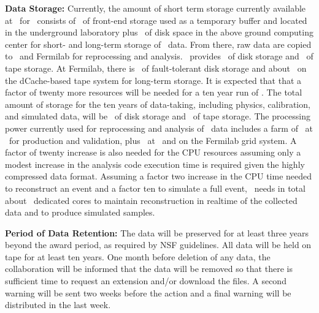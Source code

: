 {\bf Data Storage:} Currently, the amount of short term storage currently available at \LNGS\ for \DSf\ consists of \DSfDataStorageLNGSShortDisk\ of front-end storage used as a temporary buffer and located in the underground laboratory plus \DSfDataStorageLNGSLongDisk\ of disk space in the above ground computing center for short- and long-term storage of \DSf\ data.  From there, raw data are copied to \CNAF\ and Fermilab for reprocessing and analysis.  \CNAF\ provides  \DSfDataStorageCNAFDisk\ of disk storage and \DSfDataStorageCNAFTape\ of tape storage.  At Fermilab, there is \DSfDataStorageFNALDisk\ of fault-tolerant disk storage and about \DSfDataStorageFNALTape\ on the dCache-based tape system for long-term storage.  It is expected that that a factor of twenty more resources will be needed for a ten year run of \DSks.  The total amount of storage for the ten years of data-taking, including physics, calibration, and simulated data, will be \DSkDataStorageTotalDiskNewProposalExtended\ of disk storage and \DSkDataStorageTotalDiskNewProposalExtended\ of tape storage. The processing power currently used for reprocessing and analysis of \DSf\ data includes a farm of \DSfCPUsLNGS\ at \LNGS\ for production and validation, plus \DSfCPUsCNAF\ at \CNAF\ and  \DSfCPUsFNALUpgrade on the Fermilab grid system.  A factor of twenty increase is also needed for the CPU resources assuming only a modest increase in the analysis code execution time is required given the highly compressed data format. Assuming a factor two increase in the CPU time needed to reconstruct an event and a factor ten to simulate a full event, \DSks\ needs in total about \DSkOffLineCoresTotalNewProposal\ dedicated cores to maintain reconstruction in realtime of the collected data and to produce simulated samples.

{\bf Period of Data Retention:} The data will be preserved for at least three years beyond the award period, as required by NSF guidelines.  All data will be held on tape for at least ten years.  One month before deletion of any data, the collaboration will be informed that the data will be removed so that there is sufficient time to request an extension and/or download the files.  A second warning will be sent two weeks before the action and a final warning will be distributed in the last week.

